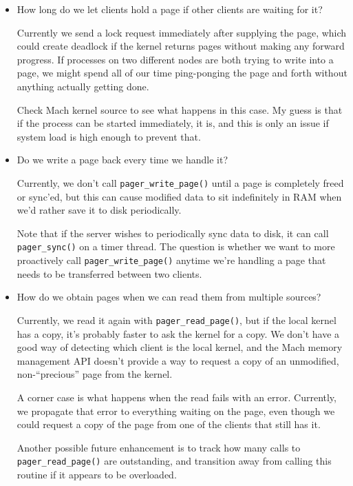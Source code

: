 \documentclass{article}
\def\pagerreadpage{{\tt pager_read_page()}\xspace}
\begin{document}
\begin{itemize}

\item How long do we let clients hold a page if other clients are waiting for it?

  Currently we send a lock request immediately after supplying the
  page, which could create deadlock if the kernel returns pages
  without making any forward progress.  If processes on two different
  nodes are both trying to write into a page, we might spend all of
  our time ping-ponging the page and forth without anything actually
  getting done.

  Check Mach kernel source to see what happens in this case.  My guess
  is that if the process can be started immediately, it is, and this
  is only an issue if system load is high enough to prevent that.

\item Do we write a page back every time we handle it?

  Currently, we don't call {\tt pager_write_page()} until a page is
  completely freed or sync'ed, but this can cause modified data to sit
  indefinitely in RAM when we'd rather save it to disk periodically.

  Note that if the server wishes to periodically sync data to disk, it
  can call {\tt pager_sync()} on a timer thread.  The question is
  whether we want to more proactively call {\tt pager_write_page()}
  anytime we're handling a page that needs to be transferred between
  two clients.

\item How do we obtain pages when we can read them from multiple sources?

  Currently, we read it again with {\tt pager_read_page()}, but if the
  local kernel has a copy, it's probably faster to ask the kernel for
  a copy.  We don't have a good way of detecting which client is the
  local kernel, and the Mach memory management API doesn't provide a
  way to request a copy of an unmodified, non-``precious'' page
  from the kernel.

  A corner case is what happens when the read fails with an error.
  Currently, we propagate that error to everything waiting on the
  page, even though we could request a copy of the page from one
  of the clients that still has it.

  Another possible future enhancement is to track how many calls
  to \pagerreadpage are outstanding, and transition away from calling
  this routine if it appears to be overloaded.


\end{itemize}
\end{document}
